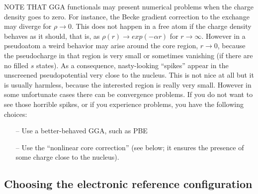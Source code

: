 NOTE THAT GGA functionals may present numerical problems
when the charge density goes to zero. For instance, the Becke
gradient correction to the exchange may diverge for 
$\rho \rightarrow 0$. This does not happen in a free atom
if the charge density behaves as it should, that is, as
$\rho(r)\rightarrow exp(-\alpha r)$ for $r \rightarrow \infty$.
However in a pseudoatom a weird behavior may arise 
around the core region, $r\rightarrow 0$, because the 
pseudocharge in that region is very small or sometimes 
vanishing (if there are no filled $s$ states). As a consequence,
nasty-looking ``spikes'' appear in the unscreened pseudopotential
very close to the nucleus. This is not nice at all but it is
usually harmless, because the interested region is really 
very small. However in some unfortunate cases there can be 
convergence problems. If you do not want to see those horrible 
spikes, or if you experience problems, you have the following
choices:
\begin{enumerate}
\item[--] Use a better-behaved GGA, such as PBE
\item[--] Use the ``nonlinear core correction'' (see below; 
it ensures the presence of some charge close to the nucleus).
\end{enumerate}


\subsection{Choosing the electronic reference configuration}

